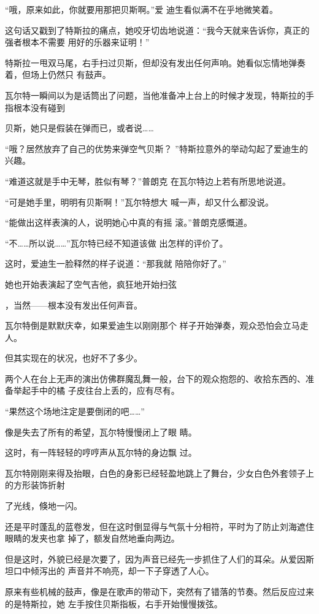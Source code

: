 \documentclass{article}
\begin{document}
“哦，原来如此，你就要用那把贝斯啊。”爱
迪生看似满不在乎地微笑着。 

这句话又戳到了特斯拉的痛点，她咬牙切齿地说道：“我今天就来告诉你，真正的强者根本不需要
用好的乐器来证明！” 

特斯拉一甩双马尾，右手扫过贝斯，但却没有发出任何声响。她看似忘情地弹奏着，但场上仍然只
有鼓声。 

瓦尔特一瞬间以为是话筒出了问题，当他准备冲上台上的时候才发现，特斯拉的手指根本没有碰到
\newpage

贝斯，她只是假装在弹而已，或者说…… 

“哦？居然放弃了自己的优势来弹空气贝斯？
”特斯拉意外的举动勾起了爱迪生的兴趣。 

“难道这就是手中无琴，胜似有琴？”普朗克
在瓦尔特边上若有所思地说道。 

“可是她手里，明明有贝斯啊！”瓦尔特想大
喊一声，却又什么都没说。 

“能做出这样表演的人，说明她心中真的有摇
滚。”普朗克感慨道。 

“不……所以说……”瓦尔特已经不知道该做
出怎样的评价了。 

这时，爱迪生一脸释然的样子说道：“那我就
陪陪你好了。” 

她也开始表演起了空气吉他，疯狂地开始扫弦
\newpage

，当然——根本没有发出任何声音。 

瓦尔特倒是默默庆幸，如果爱迪生以刚刚那个
样子开始弹奏，观众恐怕会立马走人。 


但其实现在的状况，也好不了多少。 

两个人在台上无声的演出仿佛群魔乱舞一般，台下的观众抱怨的、收拾东西的、准备举起手中的橘
子皮往台上丢的，应有尽有。 


“果然这个场地注定是要倒闭的吧……” 

像是失去了所有的希望，瓦尔特慢慢闭上了眼
睛。 

这时，有一阵轻轻的哼哼声从瓦尔特的身边飘
过。 

瓦尔特刚刚来得及抬眼，白色的身影已经轻盈地跳上了舞台，少女白色外套领子上的方形装饰折射
\newpage

了光线，倏地一闪。 

还是平时蓬乱的蓝卷发，但在这时倒显得与气氛十分相符，平时为了防止刘海遮住眼睛的发夹也拿
掉了，额发自然地垂向两边。 

但是这时，外貌已经是次要了，因为声音已经先一步抓住了人们的耳朵。从爱因斯坦口中倾泻出的
声音并不响亮，却一下子穿透了人心。 

原来有些机械的鼓声，像是在歌声的带动下，突然有了错落的节奏。然后反应过来的是特斯拉，她
左手按住贝斯指板，右手开始慢慢拨弦。 
\end{document}
